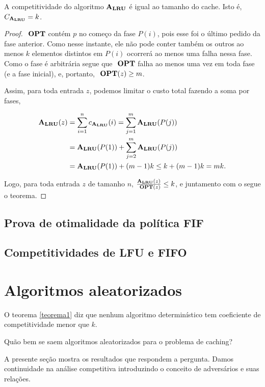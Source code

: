 \begin{theorem}
  A competitividade do algoritmo \(\mathbf{A_{LRU}}\) é igual ao tamanho do cache. Isto é, \(C_{\mathbf{A_{LRU}}} = k\).
\end{theorem}

\begin{proof}
      \(\ \textbf{OPT}\) contém \(p\) no começo da fase \(P(i)\), pois esse foi o último pedido da fase anterior. Como nesse instante, ele não pode conter também os outros ao menos \(k\) elementos distintos em \(P(i)\) ocorrerá ao menos uma falha nessa fase. Como o fase é arbitrária segue que \(\ \textbf{OPT}\) falha ao menos uma vez em toda fase (e a fase inicial), e, portanto, \(\ \textbf{OPT}(z) \ge m\).

  Assim, para toda entrada \(z\), podemos limitar o custo total fazendo a soma por fases,

    \begin{align*}
    \mathbf{A_{LRU}}(z) 
    &= \sum_{i=1}^n c_{\mathbf{A_{LRU}}}(i) = \sum_{j=1}^m \mathbf{A_{LRU}}(P(j)) 
    \\
    &= \mathbf{A_{LRU}}(P(1)) + \sum_{j=2}^m \mathbf{A_{LRU}}(P(j))
    \\
    &= \mathbf{A_{LRU}}(P(1)) + (m-1)k \le k + (m-1)k = mk.
    \end{align*}

  Logo, para toda entrada \(z\) de tamanho \(n\), \(\frac{\mathbf{A_{LRU}}(z)}{\ \textbf{OPT}(z)} \le k\), e juntamento com o  segue o teorema.
\end{proof}

\subsection{Prova de otimalidade da política \textbf{FIF}}

\subsection{Competitividades de \textbf{LFU} e \textbf{FIFO}}

\section{Algoritmos aleatorizados}

O teorema \ref{teorema1} diz que nenhum algoritmo determinístico tem coeficiente de competitividade menor que \(k\). 

Quão bem se saem algoritmos aleatorizados para o problema de caching?

A presente seção mostra os resultados que respondem a pergunta. Damos continuidade na análise competitiva introduzindo o conceito de adversários e suas relações.

